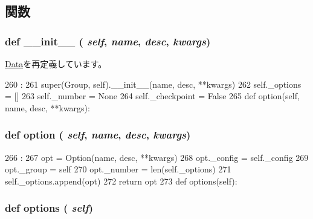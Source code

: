 \subsection{関数}
\hypertarget{classm5_1_1util_1_1jobfile_1_1Group_ac775ee34451fdfa742b318538164070e}{
\subsubsection[{\_\-\_\-init\_\-\_\-}]{\setlength{\rightskip}{0pt plus 5cm}def \_\-\_\-init\_\-\_\- ( {\em self}, \/   {\em name}, \/   {\em desc}, \/   {\em kwargs})}}
\label{classm5_1_1util_1_1jobfile_1_1Group_ac775ee34451fdfa742b318538164070e}


\hyperlink{classm5_1_1util_1_1jobfile_1_1Data_ac775ee34451fdfa742b318538164070e}{Data}を再定義しています。


\begin{DoxyCode}
260                                             :
261         super(Group, self).__init__(name, desc, **kwargs)
262         self._options = []
263         self._number = None
264         self._checkpoint = False
265 
    def option(self, name, desc, **kwargs):
\end{DoxyCode}
\hypertarget{classm5_1_1util_1_1jobfile_1_1Group_af4a909ae5c47fd431ab95fcac39fb2f6}{
\subsubsection[{option}]{\setlength{\rightskip}{0pt plus 5cm}def option ( {\em self}, \/   {\em name}, \/   {\em desc}, \/   {\em kwargs})}}
\label{classm5_1_1util_1_1jobfile_1_1Group_af4a909ae5c47fd431ab95fcac39fb2f6}



\begin{DoxyCode}
266                                           :
267         opt = Option(name, desc, **kwargs)
268         opt._config = self._config
269         opt._group = self
270         opt._number = len(self._options)
271         self._options.append(opt)
272         return opt
273 
    def options(self):
\end{DoxyCode}
\hypertarget{classm5_1_1util_1_1jobfile_1_1Group_a9eba36f181fad41a708f8b7658b2b173}{
\subsubsection[{options}]{\setlength{\rightskip}{0pt plus 5cm}def options ( {\em self})}}
\label{classm5_1_1util_1_1jobfile_1_1Group_a9eba36f181fad41a708f8b7658b2b173}



